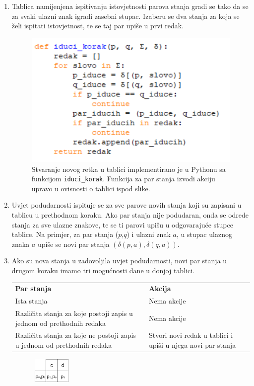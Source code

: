 \documentclass[titlepage]{article}
\begin{document}
\begin{enumerate}
\item Tablica namijenjena ispitivanju istovjetnosti parova stanja gradi se tako da se za svaki ulazni znak igradi zasebni stupac. Izaberu se dva stanja za koja se želi ispitati istovjetnost, te se taj par upiše u prvi redak. 
\begin{figure}[h]
\centering
\includegraphics[]{1korak.png}
\caption{Stvaranje novog retka u tablici implementirano je u Pythonu sa funkcijom \texttt{iduci\_korak}. Funkcija za par stanja izvodi akciju upravo u ovisnosti o tablici ispod slike.}
\end{figure}
\item Uvjet podudarnosti ispituje se za sve parove novih stanja koji su zapisani u tablicu u prethodnom koraku. Ako par stanja nije podudaran, onda se odrede stanja za sve ulazne znakove, te se ti parovi upišu u odgovarajuće stupce tablice. Na primjer, za par stanja ($p$,$q$) i ulazni znak $a$, u stupac ulaznog znaka $a$ upiše se novi par stanja $(\delta(p,a), \delta(q,a))$.

\item Ako su nova stanja u zadovoljila uvjet podudarnosti, novi par stanja u drugom koraku imamo tri mogućnosti dane u donjoj tablici.  
\newline
\begin{tabular}{p{8cm} | p{8cm}}
\textbf{Par stanja} & \textbf{Akcija} \\
Ista stanja & Nema akcije \\
Različita stanja za koje postoji zapis u jednom od prethodnih redaka & Nema akcije \\
Različita stanja za koje ne postoji zapis u jednom od prethodnih redaka & Stvori novi redak u tablici i upiši u njega novi par stanja
\end{tabular}
\begin{figure}[h]
\centering
\includegraphics[width=0.2\textwidth, height= 1.2cm]{prviprolaz.jpg}


\end{figure}
\end{enumerate}
\end{document}
